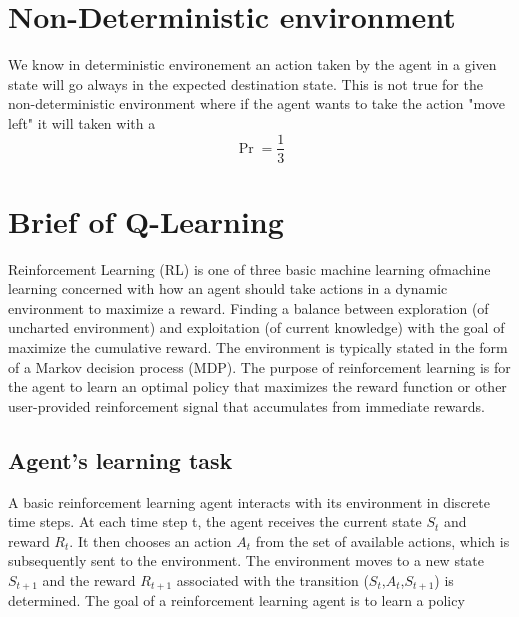\section{Non-Deterministic environment}
We know in deterministic environement an action taken by the agent in a given state will go always in the expected destination state.
This is not true for the non-deterministic environment where if the agent wants to take the action "move left" it will taken with a 
\begin{equation}
    \Pr = \frac{1}{3} 
\end{equation}

\section{Brief of Q-Learning}
Reinforcement Learning (RL) is one of three basic machine learning ofmachine learning concerned with how an agent should take actions in a dynamic environment to maximize a reward. 
Finding a balance between exploration (of uncharted environment) and exploitation (of current knowledge) with the goal of maximize the cumulative reward. 
The environment is typically stated in the form of a Markov decision process (MDP).
The purpose of reinforcement learning is for the agent to learn an optimal policy that maximizes the reward function or other user-provided reinforcement signal that accumulates from immediate rewards.
\subsection{Agent's learning task}
A basic reinforcement learning agent interacts with its environment in discrete time steps. 
At each time step t, the agent receives the current state $S_t$ and reward $R_t$. 
It then chooses an action $A_t$ from the set of available actions, which is subsequently sent to the environment. 
The environment moves to a new state $S_{t+1}$ and the reward $R_{t+1}$ 
associated with the transition ($S_t$,$A_t$,$S_{t+1}$) is determined. 
The goal of a reinforcement learning agent is to learn a policy

